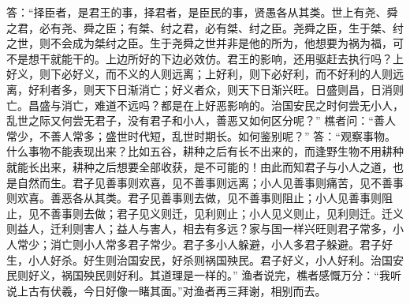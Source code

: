 \documentclass[12pt,UTF8]{ctexbook}
\begin{document}
答：“择臣者，是君王的事，择君者，是臣民的事，贤愚各从其类。世上有尧、舜之君，必有尧、舜之臣；有桀、纣之君，必有桀、纣之臣。尧舜之臣，生于桀、纣之世，则不会成为桀纣之臣。生于尧舜之世并非是他的所为，他想要为祸为福，可不是想干就能干的。上边所好的下边必效仿。君王的影响，还用驱赶去执行吗？上好义，则下必好义，而不义的人则远离；上好利，则下必好利，而不好利的人则远离，好利者多，则天下日渐消亡；好义者众，则天下日渐兴旺。日盛则昌，日消则亡。昌盛与消亡，难道不远吗？都是在上好恶影响的。治国安民之时何尝无小人，乱世之际又何尝无君子，没有君子和小人，善恶又如何区分呢？”
樵者问：“善人常少，不善人常多；盛世时代短，乱世时期长。如何鉴别呢？”
答：“观察事物。什么事物不能表现出来？比如五谷，耕种之后有长不出来的，而逢野生物不用耕种就能长出来，耕种之后想要全部收获，是不可能的！由此而知君子与小人之道，也是自然而生。君子见善事则欢喜，见不善事则远离；小人见善事则痛苦，见不善事则欢喜。善恶各从其类。君子见善事则去做，见不善事则阻止；小人见善事则阻止，见不善事则去做；君子见义则迁，见利则止；小人见义则止，见利则迁。迁义则益人，迁利则害人；益人与害人，相去有多远？家与国一样兴旺则君子常多，小人常少；消亡则小人常多君子常少。君子多小人躲避，小人多君子躲避。君子好生，小人好杀。好生则治国安民，好杀则祸国殃民。君子好义，小人好利。治国安民则好义，祸国殃民则好利。其道理是一样的。”
渔者说完，樵者感慨万分：“我听说上古有伏羲，今日好像一睹其面。”对渔者再三拜谢，相别而去。

\backmatter
\end{document}
